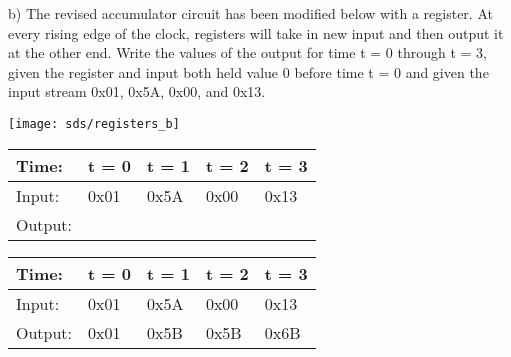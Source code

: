 \begin{blocksection}

\question
b)  The revised accumulator circuit has been modified below with a register.  At every rising edge of the clock, registers will take in new input and then output it at the other end.  Write the values of the output for time t = 0 through t = 3, given the register and input both held value 0 before time t = 0 and given the input stream 0x01, 0x5A, 0x00, and 0x13.

\texttt{[image: sds/registers\_b]}

\begin{tabular}{ |l|l|l|l|l| } 
 \hline
 Time: & t = 0 & t = 1 & t = 2 & t = 3 \\ 
 \hline
 Input: & 0x01 & 0x5A & 0x00 & 0x13 \\ 
 \hline
 Output: &  &  &  &  \\ 
 \hline
\end{tabular}

\begin{solution}
\begin{tabular}{ |l|l|l|l|l| } 
 \hline
 Time: & t = 0 & t = 1 & t = 2 & t = 3 \\ 
 \hline
 Input: & 0x01 & 0x5A & 0x00 & 0x13 \\ 
 \hline
 Output: & 0x01 & 0x5B & 0x5B & 0x6B \\ 
 \hline
\end{tabular}
\end{solution}

\end{blocksection}